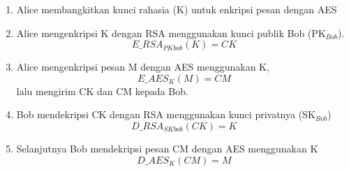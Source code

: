 \documentclass{article}
\begin{document}

\begin{enumerate}
  \item[3)] Alice membangkitkan kunci rahasia (K) untuk enkripsi pesan dengan AES
  \item[4)] Alice mengenkripsi K dengan RSA menggunakan kunci publik Bob (PK$_{Bob}$).
  \[ E\_RSA_{PKbob}(K) = CK \]
  \item[5)] Alice mengenkripsi pesan M dengan AES menggunakan K,
  \[ E\_AES_{K}(M) = CM \]
  lalu mengirim CK dan CM kepada Bob.
  \item[6)] Bob mendekripsi CK dengan RSA menggunakan kunci privatnya (SK$_{Bob}$)
  \[ D\_RSA_{SKbob}(CK) = K \]
  \item[7)] Selanjutnya Bob mendekripsi pesan CM dengan AES menggunakan K
  \[ D\_AES_{K}(CM) = M \]
\end{enumerate}

\vspace{10mm}
\end{document}
